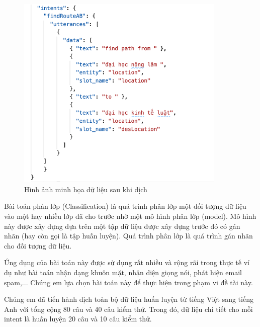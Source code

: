 \begin{figure}[H]
    \centering
    \includegraphics[width=10cm]{images/Data-train-ex.png}
    \caption{Hình ảnh minh họa dữ liệu sau khi dịch}
    \label{fig:data-train-en}
\end{figure}

Bài toán phân lớp (Classification) là quá trình phân lớp một đối tượng dữ liệu vào một hay nhiều lớp đã cho trước nhờ một mô hình phân lớp (model). Mô hình này được xây dựng dựa trên một tập dữ liệu được xây dựng trước đó có gán nhãn (hay còn gọi là tập huấn luyện). Quá trình phân lớp là quá trình gán nhãn cho đối tượng dữ liệu.

Ứng dụng của bài toán này được sử dụng rất nhiều và rộng rãi  trong thực tế ví dụ như bài toán nhận dạng khuôn mặt, nhận diện giọng nói, phát hiện email spam,... Chúng em lựa chọn bài toán này để thực hiện trong phạm vi đề tài này.

Chúng em đã tiến hành dịch toàn bộ dữ liệu huấn luyện từ tiếng Việt sang tiếng Anh với tổng cộng 80 câu và 40 câu kiểm thử. Trong đó, dữ liệu chi tiết cho mỗi intent là huấn luyện 20 câu và 10 câu kiểm thử.

